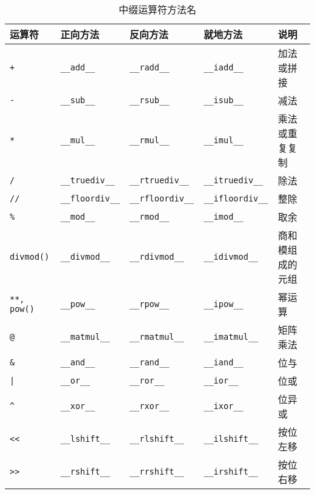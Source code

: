 \begin{table}[H]
    \centering
    \caption{中缀运算符方法名}
    \label{table:中缀运算符方法名}
    \setlength{\tabcolsep}{2mm}
    \begin{tabular}{l|llll}
        \toprule
        \textbf{运算符} & \textbf{正向方法} & \textbf{反向方法} & \textbf{就地方法} & \textbf{说明} \\
        \midrule
        \texttt{+}  & \texttt{\_\_add\_\_} & \texttt{\_\_radd\_\_} & \texttt{\_\_iadd\_\_} & 加法或拼接 \\
        \texttt{-}  & \texttt{\_\_sub\_\_} & \texttt{\_\_rsub\_\_} & \texttt{\_\_isub\_\_} & 减法\\
        \texttt{*}  & \texttt{\_\_mul\_\_} & \texttt{\_\_rmul\_\_} & \texttt{\_\_imul\_\_} & 乘法或重复复制\\
        \texttt{/}  & \texttt{\_\_truediv\_\_} & \texttt{\_\_rtruediv\_\_} & \texttt{\_\_itruediv\_\_} & 除法\\
        \texttt{//} & \texttt{\_\_floordiv\_\_} & \texttt{\_\_rfloordiv\_\_} & \texttt{\_\_ifloordiv\_\_} & 整除\\
        \texttt{\%} & \texttt{\_\_mod\_\_} & \texttt{\_\_rmod\_\_} & \texttt{\_\_imod\_\_} & 取余\\
        \texttt{divmod()} & \texttt{\_\_divmod\_\_} & \texttt{\_\_rdivmod\_\_} & \texttt{\_\_idivmod\_\_} & 商和模组成的元组\\
        \texttt{**, pow()} & \texttt{\_\_pow\_\_} & \texttt{\_\_rpow\_\_} & \texttt{\_\_ipow\_\_} & 幂运算\\
        \texttt{@} & \texttt{\_\_matmul\_\_} & \texttt{\_\_rmatmul\_\_} & \texttt{\_\_imatmul\_\_} & 矩阵乘法\\
        \texttt{\&} & \texttt{\_\_and\_\_} & \texttt{\_\_rand\_\_} & \texttt{\_\_iand\_\_} & 位与\\
        \texttt{|} & \texttt{\_\_or\_\_} & \texttt{\_\_ror\_\_} & \texttt{\_\_ior\_\_} & 位或\\
        \texttt{\^} & \texttt{\_\_xor\_\_} & \texttt{\_\_rxor\_\_} & \texttt{\_\_ixor\_\_} & 位异或\\
        \texttt{<<} & \texttt{\_\_lshift\_\_} & \texttt{\_\_rlshift\_\_} & \texttt{\_\_ilshift\_\_} & 按位左移\\
        \texttt{>>} & \texttt{\_\_rshift\_\_} & \texttt{\_\_rrshift\_\_} & \texttt{\_\_irshift\_\_} & 按位右移\\
        \bottomrule
    \end{tabular}

\end{table}

